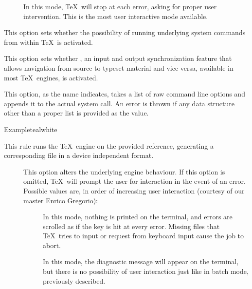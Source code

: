 \begin{description}
\begin{description}
\begin{description}
\item[] In this mode, \TeX\ will stop at each error, asking for proper user intervention. This is the most user interactive mode available.
\end{description}

\item[\rpsbox{shell}] This option sets whether the possibility of running underlying system commands from within \TeX\ is activated.

\item[\rpsbox{synctex}] This option sets whether , an input and output synchronization feature that allows navigation from source to typeset material and vice versa, available in most \TeX\ engines, is activated.

\item[\abox{options}] This option, as the name indicates, takes a list of raw command line options and appends it to the actual system call. An error is thrown if any data structure other than a proper list is provided as the value.
\end{description}

\begin{codebox}{Example}{teal}{\icnote}{white}
\end{codebox}

\item[\rulebox{uptex}]
This rule runs the  \TeX\ engine on the provided  reference, generating a corresponding file in a device independent format.

\begin{description}
\item[] This option alters the underlying engine behaviour. If this option is omitted, \TeX\ will prompt the user for interaction in the event of an error. Possible values are, in order of increasing user interaction (courtesy of our master Enrico Gregorio):

\begin{description}
\item[] In this mode, nothing is printed on the terminal, and errors are scrolled as if the  key is hit at every error. Missing files that \TeX\ tries to input or request from keyboard input cause the job to abort.

\item[] In this mode, the diagnostic message will appear on the terminal, but there is no possibility of user interaction just like in batch mode, previously described.


\end{description}
\end{description}
\end{description}

